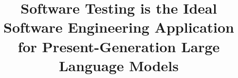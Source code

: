 \documentclass[sigconf,natbib=false]{acmart}
\begin{document}
\title{Software Testing is the Ideal Software Engineering Application
  for Present-Generation Large Language Models}








\end{document}
